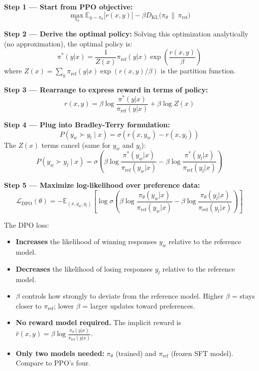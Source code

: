 \documentclass[11pt, a4paper]{article}
\begin{document}
\begin{mathbox}

\textbf{Step 1 --- Start from PPO objective:}
\[
\max_{\pi_\theta} \mathbb{E}_{y \sim \pi_\theta}\!\Big[r(x,y)\Big] - \beta D_{\text{KL}}\!\big(\pi_\theta \,\|\, \pi_{\text{ref}}\big)
\]

\textbf{Step 2 --- Derive the optimal policy:}
Solving this optimization analytically (no approximation), the optimal policy is:
\[
\pi^*(y|x) = \frac{1}{Z(x)} \pi_{\text{ref}}(y|x) \exp\!\left(\frac{r(x,y)}{\beta}\right)
\]
where $Z(x) = \sum_y \pi_{\text{ref}}(y|x) \exp(r(x,y)/\beta)$ is the partition function.

\textbf{Step 3 --- Rearrange to express reward in terms of policy:}
\[
r(x,y) = \beta \log \frac{\pi^*(y|x)}{\pi_{\text{ref}}(y|x)} + \beta \log Z(x)
\]

\textbf{Step 4 --- Plug into Bradley-Terry formulation:}
\[
P(y_w \succ y_l \mid x) = \sigma(r(x,y_w) - r(x,y_l))
\]
The $Z(x)$ terms cancel (same for $y_w$ and $y_l$):
\[
P(y_w \succ y_l \mid x) = \sigma\!\left(\beta \log \frac{\pi^*(y_w|x)}{\pi_{\text{ref}}(y_w|x)} - \beta \log \frac{\pi^*(y_l|x)}{\pi_{\text{ref}}(y_l|x)}\right)
\]

\textbf{Step 5 --- Maximize log-likelihood over preference data:}
\[
\boxed{\mathcal{L}_{\text{DPO}}(\theta) = -\mathbb{E}_{(x, y_w, y_l)}\!\left[\log \sigma\!\left(\beta \log \frac{\pi_\theta(y_w|x)}{\pi_{\text{ref}}(y_w|x)} - \beta \log \frac{\pi_\theta(y_l|x)}{\pi_{\text{ref}}(y_l|x)}\right)\right]}
\]
\end{mathbox}

\begin{notebox}
The DPO loss:
\begin{itemize}[leftmargin=1.5em]
  \item \textbf{Increases} the likelihood of winning responses $y_w$ relative to the reference model.
  \item \textbf{Decreases} the likelihood of losing responses $y_l$ relative to the reference model.
  \item $\beta$ controls how strongly to deviate from the reference model. Higher $\beta$ = stays closer to $\pi_{\text{ref}}$; lower $\beta$ = larger updates toward preferences.
  \item \textbf{No reward model required.} The implicit reward is $\hat{r}(x,y) = \beta \log \frac{\pi_\theta(y|x)}{\pi_{\text{ref}}(y|x)}$.
  \item \textbf{Only two models needed:} $\pi_\theta$ (trained) and $\pi_{\text{ref}}$ (frozen SFT model). Compare to PPO's four.
\end{itemize}
\end{notebox}
\end{document}
